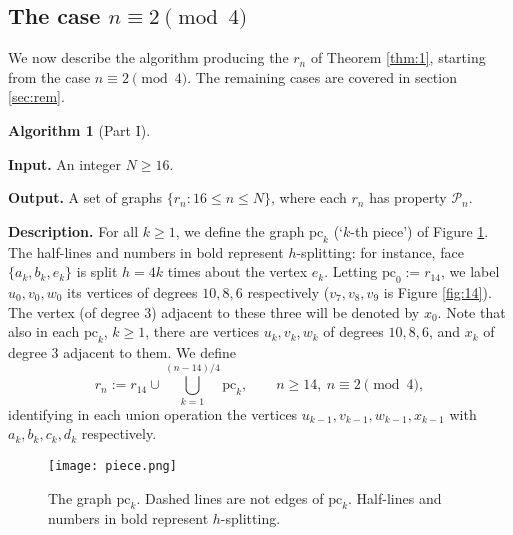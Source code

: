 \documentclass[11pt]{article}
\theoremstyle{definition}
\newtheorem{alg}[thm]{Algorithm}
\numberwithin{equation}{section}
\def\calP{\mathcal{P}}
\begin{document}
\subsection{The case $n\equiv 2 \pmod 4$}
We now describe the algorithm producing the $r_n$ of Theorem \ref{thm:1}, starting from the case $n\equiv 2 \pmod 4$. The remaining cases are covered in section \ref{sec:rem}.
\begin{alg}[Part I]
\label{alg:1}\

\textbf{Input.} An integer $N\geq 16$.

\textbf{Output.} A set of graphs $\{r_{n} : 16\leq n\leq N\}$, where each $r_n$ has property $\calP_n$.

\textbf{Description.}
For all $k\geq 1$, we define the graph $\text{pc}_{k}$ (`$k$-th piece') of Figure \ref{fig:piece}. %
The half-lines and numbers in bold represent $h$-splitting: for instance, face $\{a_k,b_k,e_k\}$ is split $h=4k$ times about the vertex $e_k$. Letting $\text{pc}_{0}:=r_{14}$, we label $u_0,v_0,w_0$ its vertices of degrees $10,8,6$ respectively ($v_7,v_8,v_9$ is Figure \ref{fig:14}). The vertex (of degree $3$) adjacent to these three will be denoted by $x_0$. Note that also in each $\text{pc}_{k}$, $k\geq 1$, there are vertices $u_k,v_k,w_k$ of degrees $10,8,6$, and $x_k$ of degree $3$ adjacent to them. We define
\begin{equation}
\label{eqn:cl1}
r_n:=r_{14}\cup\bigcup_{k=1}^{(n-14)/4}\text{pc}_{k}, \qquad n\geq 14, \ n\equiv 2 \pmod 4,
\end{equation}
identifying in each union operation the vertices $u_{k-1},v_{k-1},w_{k-1},x_{k-1}$ with $a_k,b_k,c_k,d_k$ respectively.
\begin{figure}[h!]
	\centering
	\texttt{[image: piece.png]}
	\caption{The graph $\text{pc}_{k}$. Dashed lines are not edges of $\text{pc}_{k}$. Half-lines and numbers in bold represent $h$-splitting.}
	\label{fig:piece}
\end{figure}
\end{alg}
\end{document}

